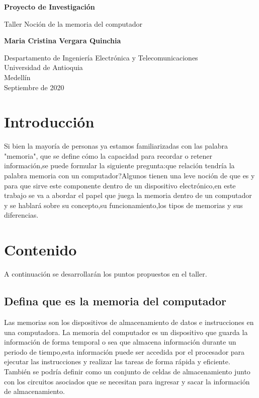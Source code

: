 \documentclass{article}
\begin{document}
\begin{titlepage}
    \begin{center}
        \vspace*{1cm}
            
        \Huge
        \textbf{Proyecto de Investigación}
            
        \vspace{0.5cm}
        \LARGE
        Taller Noción de la memoria del computador
            
        \vspace{1.5cm}
            
        \textbf{Maria Cristina Vergara Quinchia}
            
        \vfill
            
        \vspace{0.8cm}
            
        \Large
        Despartamento de Ingeniería Electrónica y Telecomunicaciones\\
        Universidad de Antioquia\\
        Medellín\\
        Septiembre de 2020
            
    \end{center}
\end{titlepage}

\tableofcontents
\newpage
\section{Introducción}\label{intro}
Si bien la mayoría de personas ya estamos familiarizadas con las palabra "memoria", que se  define cómo la capacidad para recordar o retener información,se puede formular la siguiente pregunta:que relación tendría la palabra memoria con un computador?Algunos tienen una leve noción de que es y para que sirve este componente dentro de un dispositivo electrónico,en este trabajo se va a abordar el papel que juega la memoria dentro de un computador y se hablará sobre su concepto,su funcionamiento,los tipos de memorias y sus diferencias.
\section{Contenido}\label{contenido}
A continuación se desarrollarán los puntos propuestos en el taller.

\subsection{Defina que es la memoria del computador}
Las memorias son los dispositivos de almacenamiento de datos e instrucciones en una computadora.\cite{UNT}
La memoria del computador es un dispositivo que guarda la información de forma temporal o sea que almacena información durante un periodo de tiempo,esta información puede ser accedida  por el procesador para ejecutar las instrucciones y realizar las tareas de forma rápida y eficiente.
También se podría definir como un conjunto de celdas de almacenamiento junto con los circuitos asociados que se necesitan para ingresar y sacar la información de almacenamiento.\cite{FIng}
\end{document}
